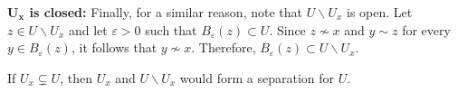 \textbf{$\boldsymbol{U_x}$ is closed:} Finally, for a similar reason, note that $U\backslash U_x$ is open. Let $z\in U\backslash U_x$ and let $\varepsilon > 0$ such that $B_\varepsilon(z) \subset U$. Since $z \not\sim x$ and $y\sim z$ for every $y\in B_\varepsilon(z)$, it follows that $y \not\sim x$. Therefore, $B_\varepsilon(z) \subset U\backslash U_x$.

If $U_x \subsetneq U$, then $U_x$ and $U\backslash U_x$ would form a separation for $U$.

